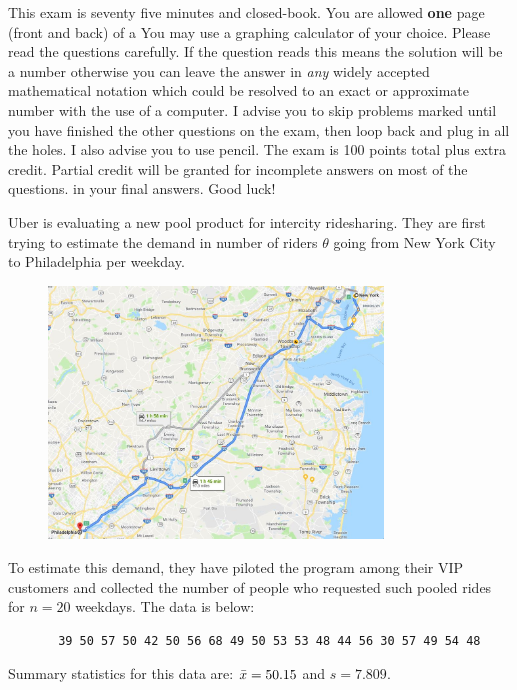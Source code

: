 \documentclass[12pt]{article}
\begin{document}
This exam is seventy five minutes and closed-book. You are allowed \textbf{one} page (front and back) of a  You may use a graphing calculator of your choice. Please read the questions carefully. If the question reads  this means the solution will be a number otherwise you can leave the answer in \textit{any} widely accepted mathematical notation which could be resolved to an exact or approximate number with the use of a computer. I advise you to skip problems marked  until you have finished the other questions on the exam, then loop back and plug in all the holes. I also advise you to use pencil. The exam is 100 points total plus extra credit. Partial credit will be granted for incomplete answers on most of the questions.  in your final answers. Good luck!

\pagebreak




\problem Uber is evaluating a new pool product for intercity ridesharing. They are first trying to estimate the demand in number of riders $\theta$ going from New York City to Philadelphia per weekday. 

\begin{figure}[htp]
\centering
\includegraphics[width=3.5in]{nyc_philly.jpg}
\end{figure}

To estimate this demand, they have piloted the program among their VIP customers and collected the number of people who requested such pooled rides for $n = 20$ weekdays. The data is below:

\begin{verbatim}
       39 50 57 50 42 50 56 68 49 50 53 53 48 44 56 30 57 49 54 48
\end{verbatim}

\noindent Summary statistics for this data are: $\bar{x} = 50.15$ and $s = 7.809$.\pagebreak
\end{document}
